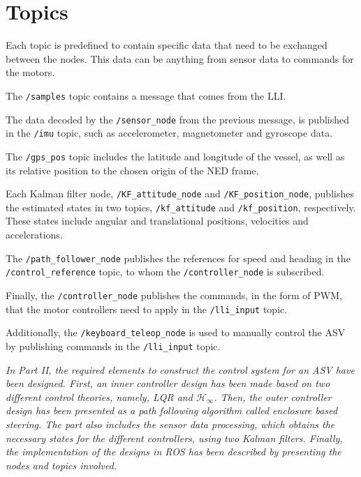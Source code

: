 \section{Topics}
Each topic is predefined to contain specific data that need to be exchanged between the nodes. This data can be anything from sensor data to commands for the motors.

The \lstinline[style=cinline]{/samples} topic contains a message that comes from the LLI.

The data decoded by the \lstinline[style=cinline]{/sensor_node} from the previous message, is published in the \lstinline[style=cinline]{/imu} topic, such as accelerometer, magnetometer and gyroscope data.

The \lstinline[style=cinline]{/gps_pos} topic includes the latitude and longitude of the vessel, as well as its relative position to the chosen origin of the NED frame.

Each Kalman filter node, \lstinline[style=cinline]{/KF_attitude_node} and \lstinline[style=cinline]{/KF_position_node}, publishes the estimated states in two topics, \lstinline[style=cinline]{/kf_attitude} and \lstinline[style=cinline]{/kf_position}, respectively. These states include angular and translational positions, velocities and accelerations.

The \lstinline[style=cinline]{/path_follower_node} publishes the references for speed and heading in the \lstinline[style=cinline]{/control_reference} topic, to whom the \lstinline[style=cinline]{/controller_node} is subscribed.

Finally, the \lstinline[style=cinline]{/controller_node} publishes the commands, in the form of PWM, that the motor controllers need to apply in the \lstinline[style=cinline]{/lli_input} topic.

Additionally, the \lstinline[style=cinline]{/keyboard_teleop_node} is used to manually control the ASV by publishing commands in the \lstinline[style=cinline]{/lli_input} topic. 


{\vspace*{\fill}
\textit{In Part II, the required elements to construct the control system for an ASV have been designed. First, an inner controller design has been made based on two different control theories, namely, LQR and $\mathcal{H}_\infty$. Then, the outer controller design has been presented as a path following algorithm called enclosure based steering. The part also includes the sensor data processing, which obtains the necessary states for the different controllers, using two Kalman filters. Finally, the implementation of the designs in ROS has been described by presenting the nodes and topics involved.}}



